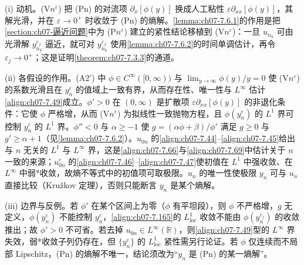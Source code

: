 \documentclass[../../main.tex]{subfiles}%
\begin{document}
\begin{remark}\label{remark:ch07-Vn逼近}
(i) 动机。(V$n^\varepsilon$) 把 (Pn) 的对流项 $\partial_x[\phi(y)]$ 换成人工粘性 $\varepsilon\partial_{xx}[\phi(y)]$，其解光滑，并在 $\varepsilon\to0^+$ 时收敛于 (Pn) 的熵解。\cref{lemma:ch07-7.6.1}的作用是把\cref{section:ch07-逼近问题}中为 (P$n^\varepsilon$) 建立的紧性结论移植到 (V$n^\varepsilon$)：一旦 $u_{n_k}$ 可由光滑解 $y_{n_k}^{\varepsilon_j}$ 逼近，就可对 $y_{n_k}^{\varepsilon_j}$ 使用\cref{lemma:ch07-7.6.2}的时间单调估计，再令 $\varepsilon_j\to0^+$；这是证明\cref{theorem:ch07-7.3.3}的通道。

(ii) 各假设的作用。(A2') 中 $\phi\in C^\infty([0,\infty))$ 与 $\lim_{y\to\infty}\phi(y)/y=0$ 使 (V$n^\varepsilon$) 的系数光滑且在 $y_n^\varepsilon$ 的值域上一致有界，从而存在性、唯一性与 $L^\infty$ 估计\eqref{align:ch07-7.49}成立。$\phi'>0$ 在 $(0,\infty)$ 是扩散项 $\varepsilon\partial_{xx}[\phi(y)]$ 的非退化条件：它使 $\phi$ 严格增，从而 (V$n^\varepsilon$) 为拟线性一致抛物方程，且 $\phi(y_n^\varepsilon)$ 的 $L^1$ 界可控制 $y_n^\varepsilon$ 的 $L^1$ 界。$\phi''<0$ 与 $\alpha\geqslant-1$ 使 $g=(\alpha\phi+\beta)/\phi'$ 满足 $g\geqslant0$ 与 $g'\geqslant\alpha+1$（见\cref{lemma:ch07-7.6.2}）。$u_{0n}$ 的\eqref{align:ch07-7.44}--\eqref{align:ch07-7.45}给出与 $n$ 无关的 $L^1$ 与 $L^\infty$ 界，这是\eqref{align:ch07-7.66}与\eqref{align:ch07-7.69}中估计关于 $n$ 一致的来源；$u_{0n}^\varepsilon$ 的\eqref{align:ch07-7.46}--\eqref{align:ch07-7.47}使初值在 $L^1$ 中强收敛、在 $L^\infty$ 中弱*收敛，故熵不等式中的初值项可取极限。$u_n$ 的唯一性使极限 $y_n$ 可与 $u_n$ 直接比较（Kružkov 定理），否则只能断言 $y_n$ 是某个熵解。

(iii) 边界与反例。若 $\phi'$ 在某个区间上为零（$\phi$ 有平坦段），则 $\phi$ 不严格增，$g$ 无定义，$\phi(y_n^\varepsilon)$ 不能控制 $y_n^\varepsilon$，\eqref{align:ch07-7.165}的 $L^1_{\mathrm{loc}}$ 收敛不能由 $\phi(y_n^{\varepsilon_j})$ 的收敛推出；故 $\phi'>0$ 不可省。若去掉 $u_{0n}\in L^\infty(\mathbb{R})$，则\eqref{align:ch07-7.49}型的 $L^\infty$ 界失效，弱*收敛子列仍存在，但 $\{y_n^\varepsilon\}$ 的 $L^1_{\mathrm{loc}}$ 紧性需另行论证。若 $\phi$ 仅连续而不局部 Lipschitz，(Pn) 的熵解不唯一，结论须改为“$y_n$ 是 (Pn) 的某一熵解”。
\end{remark}
\end{document}
